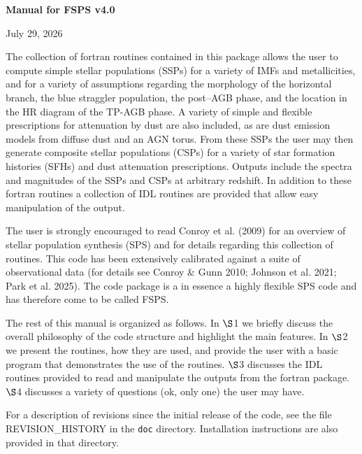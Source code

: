 \documentclass[]{article}
\begin{document}
\centerline{\bf\large Manual for FSPS v4.0}
\centerline{July 29, 2026}
\vspace{0.2in}

\vspace{0.1in}

\noindent
The collection of fortran routines contained in this package allows the user to
compute simple stellar populations (SSPs) for a variety of IMFs and
metallicities, and for a variety of assumptions regarding the morphology of the
horizontal branch, the blue straggler population, the post--AGB phase, and the
location in the HR diagram of the TP-AGB phase.  A variety of simple and
flexible prescriptions for attenuation by dust are also included, as are dust
emission models from diffuse dust and an AGN torus.  From these SSPs the user
may then generate composite stellar populations (CSPs) for a variety of star
formation histories (SFHs) and dust attenuation prescriptions.  Outputs include
the spectra and magnitudes of the SSPs and CSPs at arbitrary redshift. In
addition to these fortran routines a collection of IDL routines are provided
that allow easy manipulation of the output.

The user is strongly encouraged to read Conroy et al. (2009) for an overview of
stellar population synthesis (SPS) and for details regarding this collection of
routines.  This code has been extensively calibrated against a suite of
observational data (for details see Conroy \& Gunn 2010; Johnson et al. 2021;
Park et al. 2025).  The code package is a in essence a highly flexible SPS code
and has therefore come to be called FSPS.

The rest of this manual is organized as follows.  In $\S$1 we briefly discuss
the overall philosophy of the code structure and highlight the main features.
In $\S$2 we present the routines, how they are used, and provide the user with a
basic program that demonstrates the use of the routines.  $\S$3 discusses the
IDL routines provided to read and manipulate the outputs from the fortran
package.  $\S$4 discusses a variety of questions (ok, only one) the user may
have.

For a description of revisions since the initial release of the code, see the
file REVISION\_HISTORY in the \texttt{doc} directory.  Installation instructions
are also provided in that directory.

\vspace{0.1in}
\vspace{0.1in}
\end{document}
